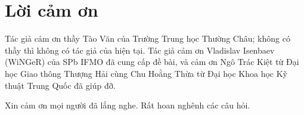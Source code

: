 \documentclass[11pt]{article}
\begin{document}
\section*{Lời cảm ơn}

Tác giả cảm ơn thầy Tào Văn của Trường Trung học Thường Châu; không có thầy
thì không có tác giả của hiện tại. Tác giả cảm ơn Vladislav Isenbaev
(WiNGeR) của SPb IFMO đã cung cấp đề bài, và cảm ơn Ngô Trác Kiệt từ Đại học
Giao thông Thượng Hải cùng Chu Hoằng Thừa từ Đại học Khoa học Kỹ thuật Trung
Quốc đã giúp đỡ.

Xin cảm ơn mọi người đã lắng nghe. Rất hoan nghênh các câu hỏi.
\end{document}
